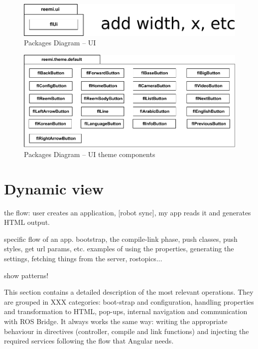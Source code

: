 \begin{figure}[htb]
    \centering
    \includegraphics{figures/design-package-ui.pdf}
    \caption{Packages Diagram -- UI}
    \label{fig:pkg-ui}
\end{figure}

\begin{figure}[htb]
    \centering
    \includegraphics{figures/design-package-uithemecomponents.pdf}
    \caption{Packages Diagram -- UI theme components}
    \label{fig:pkg-themecomponents}
\end{figure}

\FloatBarrier

\section{Dynamic view}
the flow: user creates an application, [robot sync], my app reads it and generates HTML output.

specific flow of an app. bootstrap, the compile-link phase, push classes, push styles, get url params, etc.
examples of using the properties, generating the settings, fetching things from the server, rostopics...

show patterns!

This section contains a detailed description of the most relevant operations.
They are grouped in XXX categories: boot-strap and configuration, handling properties and transformation to \ac{HTML}, pop-ups, internal navigation and communication with ROS Bridge.
It always works the same way: writing the appropriate behaviour in directives (controller, compile and link functions) and injecting the required services following the flow that Angular needs.

